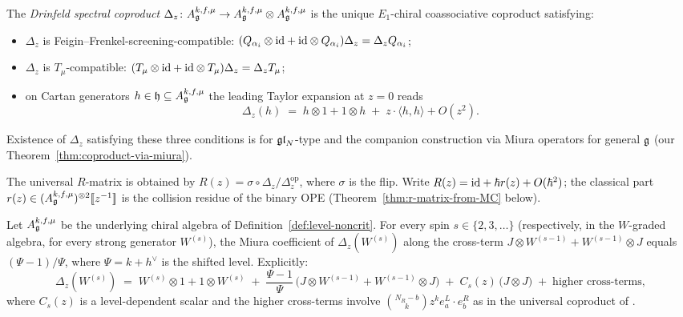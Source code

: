 \begin{definition}
\label{def:ucqg-coproduct}
The \emph{Drinfeld spectral coproduct} $\Delta_z\colon
A_{\mathfrak{g}}^{k,f,\mu}\to A_{\mathfrak{g}}^{k,f,\mu}\otimes A_{\mathfrak{g}}^{k,f,\mu}$ is the
unique $E_1$-chiral coassociative coproduct satisfying:
\begin{itemize}
\item $\Delta_z$ is Feigin--Frenkel-screening-compatible: $(Q_{\alpha_i}\otimes \mathrm{id} + \mathrm{id}\otimes Q_{\alpha_i})\Delta_z = \Delta_z Q_{\alpha_i}$;
\item $\Delta_z$ is $T_{\mu}$-compatible: $(T_{\mu}\otimes \mathrm{id} + \mathrm{id}\otimes T_{\mu})\Delta_z = \Delta_z T_{\mu}$;
\item on Cartan generators $h\in\mathfrak{h}\subseteq A_{\mathfrak{g}}^{k,f,\mu}$ the leading Taylor expansion at $z=0$ reads
\[
 \Delta_z(h) \;=\; h\otimes 1 + 1\otimes h
 \;+\; z\cdot \langle h, h\rangle + O(z^2).
\]
\end{itemize}
Existence of $\Delta_z$ satisfying these three conditions is
\cite[Theorem 5.1]{JindalKaubrysLatyntsev26} for $\mathfrak{gl}_N$-type and
the companion construction via Miura operators for general $\mathfrak{g}$
(our Theorem~\ref{thm:coproduct-via-miura}).
\end{definition}

The universal $R$-matrix is obtained by $R(z) = \sigma \circ
\Delta_z / \Delta_z^{\mathrm{op}}$, where $\sigma$ is the flip. Write
$R(z) = \mathrm{id} + \hbar r(z) + O(\hbar^2)$; the classical part
$r(z)\in (A_{\mathfrak{g}}^{k,f,\mu})^{\otimes 2}[\![z^{-1}]\!]$ is the
collision residue of the binary OPE (Theorem~\ref{thm:r-matrix-from-MC}
below).

\begin{theorem}
\label{thm:coproduct-via-miura}
\ClaimStatusProvedHere
Let $A_{\mathfrak{g}}^{k,f,\mu}$ be the underlying chiral algebra of
Definition~\ref{def:level-noncrit}. For every spin $s\in \{2, 3,
\dots\}$ (respectively, in the $W$-graded algebra, for every strong
generator $W^{(s)}$), the Miura coefficient of
$\Delta_z(W^{(s)})$ along the cross-term
$J\otimes W^{(s-1)} + W^{(s-1)}\otimes J$ equals
$(\Psi - 1)/\Psi$, where
$\Psi = k + h^{\vee}$ is the shifted level. Explicitly:
\[
 \Delta_z(W^{(s)}) \;=\; W^{(s)}\otimes 1 + 1\otimes W^{(s)}
 \;+\; \frac{\Psi - 1}{\Psi}\,
 \bigl(J\otimes W^{(s-1)} + W^{(s-1)}\otimes J\bigr)
 \;+\; C_{s}(z)\,\bigl(J\otimes J\bigr)
 \;+\; \text{higher cross-terms},
\]
where $C_{s}(z)$ is a level-dependent scalar and the higher cross-terms
involve $\binom{N_R - b}{k} z^k e^{L}_a\cdot e^{R}_b$ as in the
universal coproduct of \cite{JindalKaubrysLatyntsev26}.
\end{theorem}

